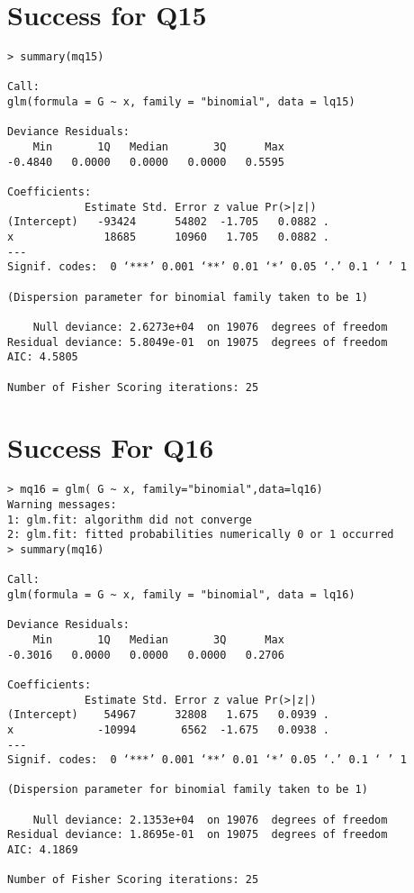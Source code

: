 \documentclass{amsart}
\begin{document}
\section{Success for Q15}

\begin{verbatim}
> summary(mq15)

Call:
glm(formula = G ~ x, family = "binomial", data = lq15)

Deviance Residuals: 
    Min       1Q   Median       3Q      Max  
-0.4840   0.0000   0.0000   0.0000   0.5595  

Coefficients:
            Estimate Std. Error z value Pr(>|z|)  
(Intercept)   -93424      54802  -1.705   0.0882 .
x              18685      10960   1.705   0.0882 .
---
Signif. codes:  0 ‘***’ 0.001 ‘**’ 0.01 ‘*’ 0.05 ‘.’ 0.1 ‘ ’ 1

(Dispersion parameter for binomial family taken to be 1)

    Null deviance: 2.6273e+04  on 19076  degrees of freedom
Residual deviance: 5.8049e-01  on 19075  degrees of freedom
AIC: 4.5805

Number of Fisher Scoring iterations: 25
\end{verbatim}

\section{Success For Q16}

\begin{verbatim}
> mq16 = glm( G ~ x, family="binomial",data=lq16)
Warning messages:
1: glm.fit: algorithm did not converge 
2: glm.fit: fitted probabilities numerically 0 or 1 occurred 
> summary(mq16)

Call:
glm(formula = G ~ x, family = "binomial", data = lq16)

Deviance Residuals: 
    Min       1Q   Median       3Q      Max  
-0.3016   0.0000   0.0000   0.0000   0.2706  

Coefficients:
            Estimate Std. Error z value Pr(>|z|)  
(Intercept)    54967      32808   1.675   0.0939 .
x             -10994       6562  -1.675   0.0938 .
---
Signif. codes:  0 ‘***’ 0.001 ‘**’ 0.01 ‘*’ 0.05 ‘.’ 0.1 ‘ ’ 1

(Dispersion parameter for binomial family taken to be 1)

    Null deviance: 2.1353e+04  on 19076  degrees of freedom
Residual deviance: 1.8695e-01  on 19075  degrees of freedom
AIC: 4.1869

Number of Fisher Scoring iterations: 25
\end{verbatim}
\end{document}
